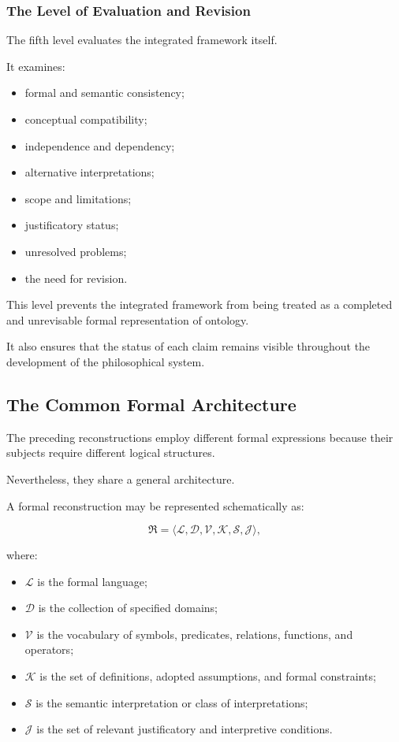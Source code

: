 \subsubsection{The Level of Evaluation and Revision}

The fifth level evaluates the integrated
framework itself.

It examines:

\begin{itemize}
    \item formal and semantic consistency;
    \item conceptual compatibility;
    \item independence and dependency;
    \item alternative interpretations;
    \item scope and limitations;
    \item justificatory status;
    \item unresolved problems;
    \item the need for revision.
\end{itemize}

This level prevents the integrated
framework from being treated as
a completed and unrevisable formal
representation of ontology.

It also ensures that the status
of each claim remains visible
throughout the development of
the philosophical system.

\subsection{The Common Formal Architecture}

The preceding reconstructions employ
different formal expressions because
their subjects require different
logical structures.

Nevertheless, they share a general
architecture.

A formal reconstruction may be
represented schematically as:

\[
    \mathfrak{R}
    =
    \langle
        \mathcal{L},
        \mathcal{D},
        \mathcal{V},
        \mathcal{K},
        \mathcal{S},
        \mathcal{J}
    \rangle,
\]

where:

\begin{itemize}
    \item \(\mathcal{L}\) is the formal language;
    \item \(\mathcal{D}\) is the collection of
    specified domains;
    \item \(\mathcal{V}\) is the vocabulary
    of symbols, predicates, relations,
    functions, and operators;
    \item \(\mathcal{K}\) is the set of
    definitions, adopted assumptions,
    and formal constraints;
    \item \(\mathcal{S}\) is the semantic
    interpretation or class of interpretations;
    \item \(\mathcal{J}\) is the set of
    relevant justificatory and interpretive
    conditions.
\end{itemize}

